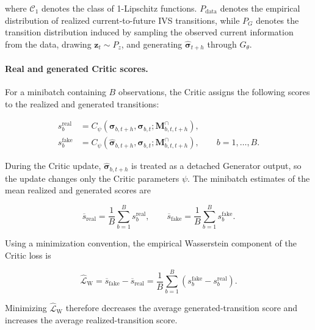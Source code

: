 where $\mathcal{C}_1$ denotes the class of 1-Lipschitz functions.
$P_{\mathrm{data}}$ denotes the empirical distribution of realized
current-to-future IVS transitions, while $P_G$ denotes the transition
distribution induced by sampling the observed current information from the
data, drawing $\mathbf{z}_t\sim P_z$, and generating
$\widehat{\boldsymbol{\sigma}}_{t+h}$ through $G_{\theta}$.


\paragraph*{Real and generated Critic scores.}
For a minibatch containing $B$ observations, the Critic assigns the following
scores to the realized and generated transitions:

\begin{align}
s^{\mathrm{real}}_b
&=
C_{\psi}
\left(
\boldsymbol{\sigma}_{b,t+h},
\boldsymbol{\sigma}_{b,t};
\mathbf{M}^{\cap}_{b,t,t+h}
\right),
\label{eq:ch3:critic_real_score}\\
s^{\mathrm{fake}}_b
&=
C_{\psi}
\left(
\widehat{\boldsymbol{\sigma}}_{b,t+h},
\boldsymbol{\sigma}_{b,t};
\mathbf{M}^{\cap}_{b,t,t+h}
\right),
\qquad
b=1,\ldots,B.
\label{eq:ch3:critic_fake_score}
\end{align}

During the Critic update, $\widehat{\boldsymbol{\sigma}}_{b,t+h}$ is treated as a detached Generator output, so the update changes only the Critic parameters $\psi$. The minibatch
estimates of the mean realized and generated scores are

\begin{equation}\label{eq:ch3:critic_mean_scores}
\overline{s}_{\mathrm{real}}
=
\frac{1}{B}
\sum_{b=1}^{B}
s^{\mathrm{real}}_b,
\qquad
\overline{s}_{\mathrm{fake}}
=
\frac{1}{B}
\sum_{b=1}^{B}
s^{\mathrm{fake}}_b.
\end{equation}

Using a minimization convention, the empirical Wasserstein component of the Critic loss is

\begin{equation}\label{eq:ch3:critic_wasserstein_component}
\widehat{\mathcal{L}}_{\mathrm{W}}
=
\overline{s}_{\mathrm{fake}}
-
\overline{s}_{\mathrm{real}}
=
\frac{1}{B}
\sum_{b=1}^{B}
\left(
s^{\mathrm{fake}}_b
-
s^{\mathrm{real}}_b
\right).
\end{equation}

Minimizing $\widehat{\mathcal{L}}_{\mathrm{W}}$ therefore decreases the
average generated-transition score and increases the average
realized-transition score.


